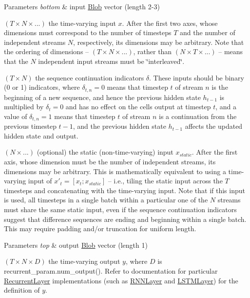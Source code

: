 \begin{DoxyParams}{Parameters}
{\em bottom} & input \mbox{\hyperlink{classcaffe_1_1_blob}{Blob}} vector (length 2-\/3)\\
\hline
\end{DoxyParams}

\begin{DoxyEnumerate}
\item $ (T \times N \times ...) $ the time-\/varying input $ x $. After the first two axes, whose dimensions must correspond to the number of timesteps $ T $ and the number of independent streams $ N $, respectively, its dimensions may be arbitrary. Note that the ordering of dimensions -- $ (T \times N \times ...) $, rather than $ (N \times T \times ...) $ -- means that the $ N $ independent input streams must be \char`\"{}interleaved\char`\"{}.
\item $ (T \times N) $ the sequence continuation indicators $ \delta $. These inputs should be binary (0 or 1) indicators, where $ \delta_{t,n} = 0 $ means that timestep $ t $ of stream $ n $ is the beginning of a new sequence, and hence the previous hidden state $ h_{t-1} $ is multiplied by $ \delta_t = 0 $ and has no effect on the cell\textquotesingle{}s output at timestep $ t $, and a value of $ \delta_{t,n} = 1 $ means that timestep $ t $ of stream $ n $ is a continuation from the previous timestep $ t-1 $, and the previous hidden state $ h_{t-1} $ affects the updated hidden state and output.
\item $ (N \times ...) $ (optional) the static (non-\/time-\/varying) input $ x_{static} $. After the first axis, whose dimension must be the number of independent streams, its dimensions may be arbitrary. This is mathematically equivalent to using a time-\/varying input of $ x'_t = [x_t; x_{static}] $ -- i.\+e., tiling the static input across the $ T $ timesteps and concatenating with the time-\/varying input. Note that if this input is used, all timesteps in a single batch within a particular one of the $ N $ streams must share the same static input, even if the sequence continuation indicators suggest that difference sequences are ending and beginning within a single batch. This may require padding and/or truncation for uniform length.
\end{DoxyEnumerate}


\begin{DoxyParams}{Parameters}
{\em top} & output \mbox{\hyperlink{classcaffe_1_1_blob}{Blob}} vector (length 1)
\begin{DoxyEnumerate}
\item $ (T \times N \times D) $ the time-\/varying output $ y $, where $ D $ is {\ttfamily recurrent\+\_\+param.\+num\+\_\+output()}. Refer to documentation for particular \mbox{\hyperlink{classcaffe_1_1_recurrent_layer}{Recurrent\+Layer}} implementations (such as \mbox{\hyperlink{classcaffe_1_1_r_n_n_layer}{R\+N\+N\+Layer}} and \mbox{\hyperlink{classcaffe_1_1_l_s_t_m_layer}{L\+S\+T\+M\+Layer}}) for the definition of $ y $. 
\end{DoxyEnumerate}\\
\hline
\end{DoxyParams}


